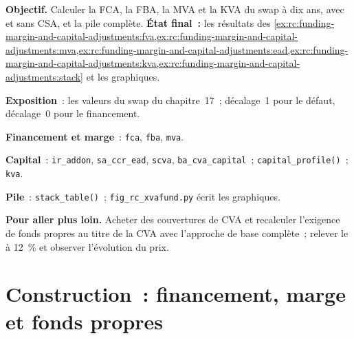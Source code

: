 \begin{tutorial}
\textbf{Objectif.} Calculer la FCA, la FBA, la MVA et la KVA du swap à dix ans, avec et sans CSA, et
la pile complète. \textbf{État final~:} les résultats
des \cref{ex:rc:funding-margin-and-capital-adjustments:fva,ex:rc:funding-margin-and-capital-adjustments:mva,ex:rc:funding-margin-and-capital-adjustments:ead,ex:rc:funding-margin-and-capital-adjustments:kva,ex:rc:funding-margin-and-capital-adjustments:stack}
et les graphiques.
\begin{tutsteps}
\item \textbf{Exposition}~: les valeurs du swap du chapitre~17~; décalage~1 pour le défaut, décalage~0 pour le financement.
\item \textbf{Financement et marge}~: \texttt{fca}, \texttt{fba}, \texttt{mva}.
\item \textbf{Capital}~: \texttt{ir\_addon}, \texttt{sa\_ccr\_ead}, \texttt{scva},
\texttt{ba\_cva\_capital}~; \texttt{capital\_profile()}~; \texttt{kva}.
\item \textbf{Pile}~: \texttt{stack\_table()}~; \texttt{fig\_rc\_xvafund.py} écrit les graphiques.
\end{tutsteps}
\textbf{Pour aller plus loin.} Acheter des couvertures de CVA et recalculer l'exigence de fonds propres au titre de la CVA avec l'approche de base
complète~; relever le  à 12~\% et observer l'évolution du prix.
\end{tutorial}

\section{Construction~: financement, marge et fonds propres}\label{bld:rc:funding-margin-and-capital-adjustments:xvafund}

